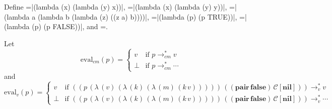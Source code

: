 \documentclass[ms,electronic,twosidetoc,letterpaper,chaptercenter,parttop]{byumsphd}
\begin{document}


Define =\scheme|(lambda (x) (lambda (y) x))|, =\scheme|(lambda
(x) (lambda (y) y))|, =\scheme|(lambda a (lambda b (lambda (z) ((z a) b))))|,
=\scheme|(lambda (p) (p TRUE))|, =\scheme|(lambda (p) (p FALSE))|,
and =.

Let
\[
\mathrm{eval}_{cm}(p)=\begin{cases}
v     &\text{if $p\rightarrow_{cm}^{*}v$}\\
\perp &\text{if $p\rightarrow_{cm}^{*}\cdots$}
\end{cases}
\]
and
\[
\mathrm{eval}_{v}(p)=\begin{cases}
v     &\text{if $((p\,(\lambda\,(v)\,(\lambda\,(k)\,(\lambda\,(m)\,(k\,v)))))\,((\mathbf{pair}\,\mathbf{false})\,\mathcal{C}[\mathbf{nil}]))\rightarrow_{v}^{*}v$}\\
\perp &\text{if $((p\,(\lambda\,(v)\,(\lambda\,(k)\,(\lambda\,(m)\,(k\,v)))))\,((\mathbf{pair}\,\mathbf{false})\,\mathcal{C}[\mathbf{nil}]))\rightarrow_{v}^{*}\cdots$}
\end{cases}
\]


\newtheorem{lemma}{Lemma}
\newtheorem{theorem}{Theorem}
\newtheorem{case}{Case}

\end{document}
